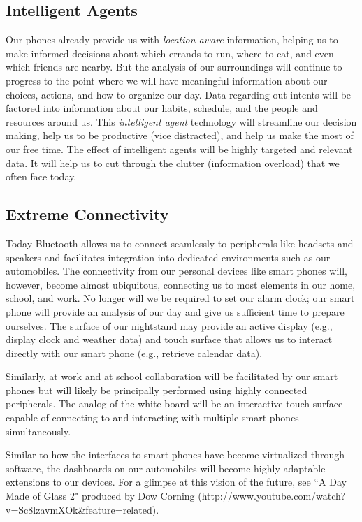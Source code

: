 \documentclass[letterpaper,12pt]{article}
\begin{document}
\subsection*{Intelligent Agents}
Our phones already provide us with \emph{location aware} information, helping us to make informed decisions about which errands to run, where to eat, and even which friends are nearby.  But the analysis of our surroundings will continue to progress to the point where we will have meaningful information about our choices, actions, and how to organize our day.  Data regarding out intents will be factored into information about our habits, schedule, and the people and resources around us.  This \emph{intelligent agent} technology will streamline our decision making, help us to be productive (vice distracted), and help us make the most of our free time.  The effect of intelligent agents will be highly targeted and relevant data.  It will help us to cut through the clutter (information overload) that we often face today.

\subsection*{Extreme Connectivity}
Today Bluetooth allows us to connect seamlessly to peripherals like headsets and speakers and facilitates integration into dedicated environments such as our automobiles.  The connectivity from our personal devices like smart phones will, however, become almost ubiquitous, connecting us to most elements in our home, school, and work.  No longer will we be required to set our alarm clock; our smart phone will provide an analysis of our day and give us sufficient time to prepare ourselves.  The surface of our nightstand may provide an active display (e.g., display clock and weather data) and touch surface that allows us to interact directly with our smart phone (e.g., retrieve calendar data).

Similarly, at work and at school collaboration will be facilitated by our smart phones but will likely be principally performed using highly connected peripherals.  The analog of the white board will be an interactive touch surface capable of connecting to and interacting with multiple smart phones simultaneously.

Similar to how the interfaces to smart phones have become virtualized through software, the dashboards on our automobiles will become highly adaptable extensions to our devices.  For a glimpse at this vision of the future, see ``A Day Made of Glass 2" produced by Dow Corning (http://www.youtube.com/watch?v=Sc8lzavmXOk\&feature=related).
\end{document}
